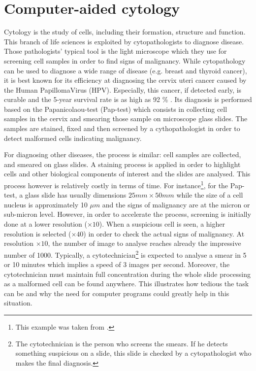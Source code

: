 \section{Computer-aided cytology}
\label{sec:cadc}
Cytology is the study of cells, including their formation, structure and function. This branch of life sciences is exploited by cytopathologists to diagnose disease. Those pathologists' typical tool is the light microscope which they use for screening cell samples in order to find signs of malignancy. While cytopathology can be used to diagnose a wide range of disease (e.g. breast and thyroid cancer), it is best known for its efficiency at diagnosing the cervix uteri cancer caused by the Human PapillomaVirus (HPV). Especially, this cancer, if detected early, is curable and the 5-year survival rate is as high as 92 \% \cite{bengtsson2014screening}. Its diagnosis is performed based on the Papanicolaou-test (Pap-test) which consists in collecting cell samples in the cervix and smearing those sample on microscope glass slides. The samples are stained, fixed and then screened by a cythopathologist in order to detect malformed cells indicating malignancy. 

For diagnosing other diseases, the process is similar: cell samples are collected, and smeared on glass slides. A staining process is applied in order to highlight cells and other biological components of interest and the slides are analysed. This process however is relatively costly in terms of time. For instance\footnote{This example was taken from \cite{bengtsson2014screening}.}, for the Pap-test, a glass slide has usually dimensions $25mm \times 50mm$ while the size of a cell nucleus is approximately 10 $\mu m$ and the signs of malignancy are at the micron or sub-micron level. However, in order to accelerate the process, screening is initially done at a lower resolution ($\times 10$). When a suspicious cell is seen, a higher resolution is selected ($\times 40$) in order to check the actual signs of malignancy. 
At resolution $\times 10$, the number of image to analyse reaches already the impressive number of 1000. Typically, a cytotechnician\footnote{The cytotechnician is the person who screens the smears. If he detects something suspicious on a slide, this slide is checked by a cytopathologist who makes the final diagnosis.} is expected to analyse a smear in 5 or 10 minutes which implies a speed of 3 images per second. Moreover, the cytotechnician must maintain full concentration during the whole slide processing as a malformed cell can be found anywhere. This illustrates how tedious the task can be and why the need for computer programs could greatly help in this situation. 

